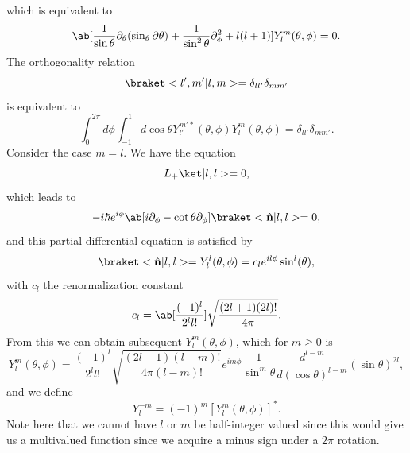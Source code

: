 which is equivalent to 
\begin{equation}
    \ab[ \frac{1}{\sin\theta} \partial_\theta (\sin_\theta\partial\theta) + \frac{1}{\sin^2\theta} \partial_\phi^2 + l(l+1) ]Y_l^m(\theta,\phi) = 0.
\end{equation}
The orthogonality relation
\begin{equation}
    \bk{l',m'}{l,m} = \delta_{ll'}\delta_{mm'}
\end{equation}
is equivalent to 
\begin{equation}
    \int_0^{2\pi} d\phi \int_{-1}^1 d\cos\theta Y_{l'}^{m'*}(\theta,\phi)Y_l^m(\theta, \phi) = \delta_{ll'}\delta_{mm'}.
\end{equation}
Consider the case $m=l$. We have the equation
\begin{equation}
    L_+\k{l,l} = 0,
\end{equation}
which leads to 
\begin{equation}
    -i \hbar e^{i\phi} \ab[ i\partial_\phi - \cot\theta \partial_\phi ]\bk{\hat{\vec{n}}}{l,l} = 0,
\end{equation}
and this partial differential equation is satisfied by
\begin{equation}
    \bk{\hat{\vec{n}}}{l,l} = Y_l^l(\theta, \phi) = c_l e^{il\phi} \sin^l(\theta),
\end{equation}
with $c_l$ the renormalization constant
\begin{equation}
    c_l = \ab[\frac{(-1)^l}{2^l l!}] \sqrt{\frac{(2l+1)(2l)!}{4\pi}}.
\end{equation}
From this we can obtain subsequent $Y_l^m(\theta,\phi)$, which for $m\geq 0$ is
\begin{equation}
    Y_l^m(\theta,\phi) = \frac{(-1)^l}{2^l l!} \sqrt{\frac{(2l+1)(l+m)!}{4\pi (l-m)!}} e^{im\phi} \frac{1}{\sin^m\theta} \frac{d^{l-m}}{d(\cos\theta)^{l-m}} (\sin\theta)^{2l},
\end{equation}
and we define
\begin{equation}
    Y_l^{-m} = (-1)^m [Y_l^m(\theta,\phi)]^*.
\end{equation}
Note here that we cannot have $l$ or $m$ be half-integer valued since this would give us a multivalued function since we acquire a minus sign under a $2\pi$ rotation.


